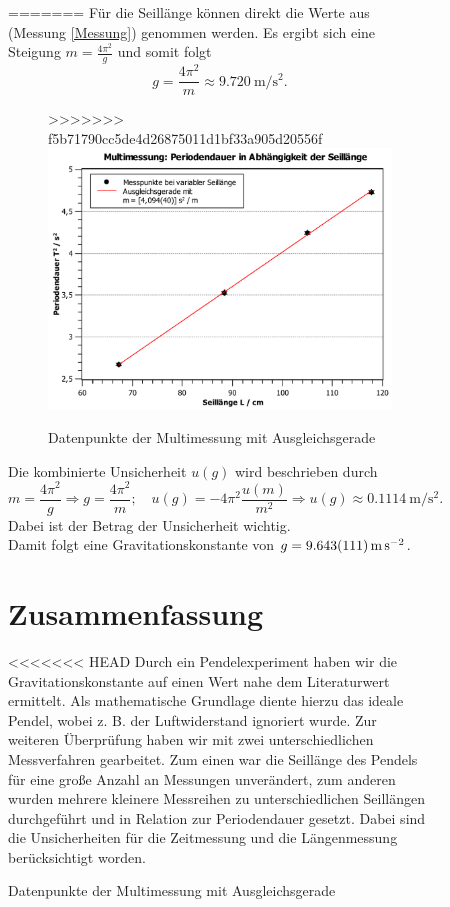 \documentclass[11pt,a4paper,titlepage, ngerman]{article}
\begin{document}
		\begin{figure}[ht]
=======
		Für die Seillänge können direkt die Werte aus (Messung \ref{Messung}) genommen werden.
		Es ergibt sich eine Steigung $m = \frac{4 \pi^2}{g}$ und somit folgt
		\begin{equation}
			g = \frac{4 \pi^2}{m} \approx \SI{9,720}{\meter\per\second\squared}.
		\end{equation}
			
		\begin{figure}
>>>>>>> f5b71790cc5de4d26875011d1bf33a905d20556f
			\centering
			\includegraphics[width=\textwidth]{SteigungMultimessung_2.pdf}
			\caption{Datenpunkte der Multimessung mit Ausgleichsgerade}
			\label{fig:multi}
		\end{figure}
		
		Die kombinierte Unsicherheit $u(g)$ wird beschrieben durch
		\begin{equation*}
			m = \frac{4 \pi^2}{g} \Rightarrow g = \frac{4 \pi^2}{m};\quad 
			u(g) = -4\pi^2 \frac{u(m)}{m^2} \Rightarrow u(g) \approx \SI{0,1114}{\meter\per\second\squared}.
		\end{equation*}
		Dabei ist der Betrag der Unsicherheit wichtig.\\
		Damit folgt eine Gravitationskonstante von $g = \SI{9,643 +- 0,111}{\meter\per\second\squared}$.
		
	\section{Zusammenfassung}
<<<<<<< HEAD
		Durch ein Pendelexperiment haben wir die Gravitationskonstante auf einen Wert nahe dem Literaturwert ermittelt.
		Als mathematische Grundlage diente hierzu das ideale Pendel, wobei z. B. der Luftwiderstand ignoriert wurde.
		Zur weiteren Überprüfung haben wir mit zwei unterschiedlichen Messverfahren gearbeitet.
		Zum einen war die Seillänge des Pendels für eine große Anzahl an Messungen unverändert, zum anderen wurden mehrere kleinere Messreihen zu unterschiedlichen Seillängen durchgeführt und in Relation zur Periodendauer gesetzt.
		Dabei sind die Unsicherheiten für die Zeitmessung und die Längenmessung berücksichtigt worden.
		

\end{figure}
\end{document}
